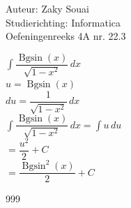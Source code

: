 \documentclass[a4paper]{article}
\newcommand{\Bgsin}{\operatorname{Bgsin}}
\begin{document}
  
\noindent \large Auteur: Zaky Souai \\
\noindent \large Studierichting:  Informatica\\
\noindent \large Oefeningenreeks 4A nr. 22.3\\

\bigskip

\normalsize

$\displaystyle \int \dfrac{\Bgsin(x)}{\sqrt{1-x^2}}\,dx$\\

$\displaystyle u=\Bgsin(x)$\\

$\displaystyle du=\dfrac{1}{\sqrt{1-x^2}}\,dx$\\

$\displaystyle \int \dfrac{\Bgsin(x)}{\sqrt{1-x^2}}\,dx=\int u\,du$\\

$\displaystyle =\dfrac{u^2}{2}+C$\\

$\displaystyle =\dfrac{\Bgsin^2(x)}{2}+C$


\begin{thebibliography}{999}
\end{thebibliography}
\end{document}

